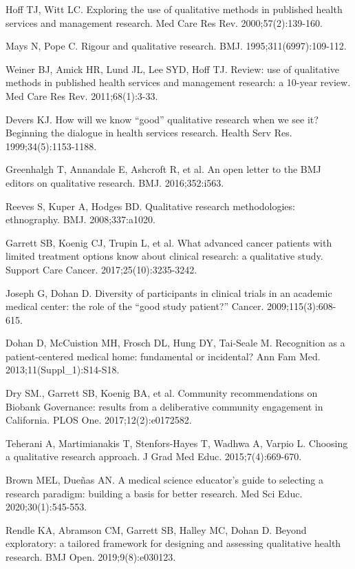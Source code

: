 \begin{references}
\item Hoff TJ, Witt LC. Exploring the use of qualitative methods in published health services and management research. Med Care Res Rev. 2000;57(2):139-160.
\item Mays N, Pope C. Rigour and qualitative research. BMJ. 1995;311(6997):109-112.
\item Weiner BJ, Amick HR, Lund JL, Lee SYD, Hoff TJ. Review: use of qualitative methods in published health services and management research: a 10-year review. Med Care Res Rev. 2011;68(1):3-33.
\item Devers KJ. How will we know “good” qualitative research when we see it? Beginning the dialogue in health services research. Health Serv Res. 1999;34(5):1153-1188.
\item Greenhalgh T, Annandale E, Ashcroft R, et al. An open letter to the BMJ editors on qualitative research. BMJ. 2016;352:i563.
\item Reeves S, Kuper A, Hodges BD. Qualitative research methodologies: ethnography. BMJ. 2008;337:a1020.
\item Garrett SB, Koenig CJ, Trupin L, et al. What advanced cancer patients with limited treatment options know about clinical research: a qualitative study. Support Care Cancer. 2017;25(10):3235-3242.
\item Joseph G, Dohan D. Diversity of participants in clinical trials in an academic medical center: the role of the “good study patient?” Cancer. 2009;115(3):608-615.
\item Dohan D, McCuistion MH, Frosch DL, Hung DY, Tai-Seale M. Recognition as a patient-centered medical home: fundamental or incidental? Ann Fam Med. 2013;11(Suppl\_1):S14-S18.
\item Dry SM., Garrett SB, Koenig BA, et al. Community recommendations on Biobank Governance: results from a deliberative community engagement in California. PLOS One. 2017;12(2):e0172582.
\item Teherani A, Martimianakis T, Stenfors-Hayes T, Wadhwa A, Varpio L. Choosing a qualitative research approach. J Grad Med Educ. 2015;7(4):669-670.
\item Brown MEL, Dueñas AN. A medical science educator’s guide to selecting a research paradigm: building a basis for better research. Med Sci Educ. 2020;30(1):545-553.
\item Rendle KA, Abramson CM, Garrett SB, Halley MC, Dohan D. Beyond exploratory: a tailored framework for designing and assessing qualitative health research. BMJ Open. 2019;9(8):e030123.

\end{references}
